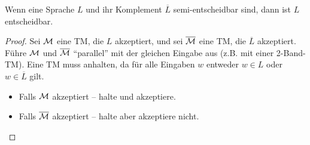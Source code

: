 


\begin{Satz}[name={[{$L,\overline{L}$ semi-entscheidbar $\=> L$ entscheidbar}]},restate={[name=Wiederholung]repeatSatz613}]\label{satz:6.13}
    Wenn eine Sprache $L$ und ihr Komplement $\overline{L}$ semi-entscheidbar sind, dann ist $L$ entscheidbar.
\end{Satz}
\begin{proof}
	Sei $\mathcal{M}$ eine \ac{TM}, die $L$ akzeptiert, und sei $\overline{\mathcal{M}}$ eine \ac{TM}, die $\overline{L}$ akzeptiert.
	Führe $\mathcal{M}$ und $\overline{\mathcal{M}}$ "`parallel"' mit der gleichen Eingabe aus (z.B. mit einer 2-Band-\ac{TM}).\newline
	Eine \ac{TM} muss anhalten, da für alle Eingaben $w$ entweder $w \in L$ oder $w \in \overline{L}$ gilt.
	\begin{itemize}
	\item Falls $\mathcal{M}$ akzeptiert -- halte und akzeptiere.
	\item Falls $\overline{\mathcal{M}}$ akzeptiert -- halte aber akzeptiere nicht. \qedhere
	\end{itemize}
\end{proof}

